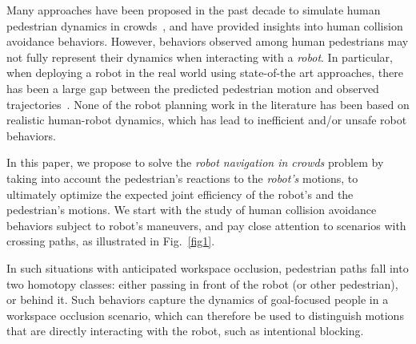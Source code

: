 \documentclass[conference]{IEEEtran}
\begin{document}
Many approaches have been proposed in the 
past decade to simulate human pedestrian dynamics in crowds~\cite{helbing1995social,lamarche2004crowd, 
karamouzas2009predictive}, and have provided insights into human collision avoidance behaviors.
However, 
behaviors observed among human pedestrians may not fully 
represent their dynamics when interacting with a \emph{robot}. 
In particular, when deploying a robot in the real world using state-of-the art approaches, there has been a 
large gap between the predicted pedestrian motion and observed trajectories~\cite{trautman2015robot,pfeiffer2016predicting}. 
None of the robot planning work in the literature has been based on realistic human-robot dynamics,
 which has lead to inefficient and/or unsafe robot behaviors.

In this paper, we propose to solve the \emph{robot navigation 
in crowds} problem by taking into account the pedestrian's reactions to the 
\emph{robot's} motions, to ultimately optimize the expected joint efficiency 
of the robot's and the pedestrian's motions. We start with the study of human 
collision avoidance behaviors subject to robot's maneuvers, and pay close 
attention to scenarios with crossing paths, as illustrated in Fig.~\ref{fig1}.

In such situations with anticipated workspace occlusion,
pedestrian paths fall into two homotopy classes: either passing in front of the 
robot (or other pedestrian), or behind it. Such behaviors capture the dynamics of 
goal-focused people in a workspace occlusion scenario, which can therefore 
be used to distinguish motions that are directly interacting with the robot, such as 
intentional blocking.




\end{document}
